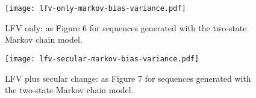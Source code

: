\documentclass[
      draft,
      ef,
]{agutexSI2019}
\begin{document}
    \begin{figure}
      \centering
      \texttt{[image: lfv-only-markov-bias-variance.pdf]}
      \caption{
        LFV only: as Figure 6 for sequences generated with the two-state Markov chain model.
      }\label{fig:lfv-markov-bias-variance}
    \end{figure}
    
    \begin{figure}
      \centering
      \texttt{[image: lfv-secular-markov-bias-variance.pdf]}
      \caption{
        LFV plus secular change: as Figure 7 for sequences generated with the two-state Markov chain model.
      }\label{fig:lfv-secular-markov-bias-variance}
    \end{figure}
\end{document}
